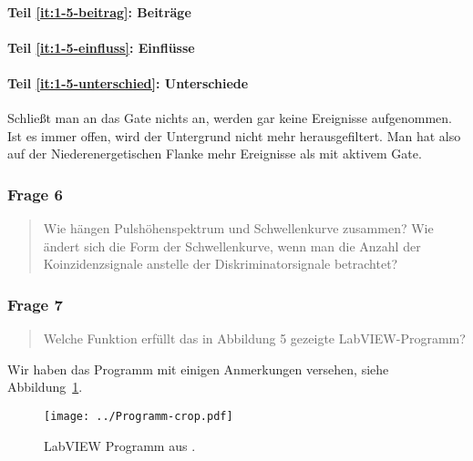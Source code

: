 \documentclass[11pt, ngerman, fleqn, DIV=15, headinclude, BCOR=2cm]{scrreprt}
\begin{document}
\paragraph{Teil \ref{it:1-5-beitrag}: Beiträge}


\paragraph{Teil \ref{it:1-5-einfluss}: Einflüsse}


\paragraph{Teil \ref{it:1-5-unterschied}: Unterschiede}

Schließt man an das Gate nichts an, werden gar keine Ereignisse aufgenommen.
Ist es immer offen, wird der Untergrund nicht mehr herausgefiltert. Man hat
also auf der Niederenergetischen Flanke mehr Ereignisse als mit aktivem Gate.

\subsubsection{Frage 6}

\begin{quote}
    Wie hängen Pulshöhenspektrum und Schwellenkurve zusammen? Wie ändert sich
    die Form der Schwellenkurve, wenn man die Anzahl der Koinzidenzsignale
    anstelle der Diskriminatorsignale betrachtet?
\end{quote}


\subsubsection{Frage 7}

\begin{quote}
    Welche Funktion erfüllt das in Abbildung 5 gezeigte LabVIEW-Programm?
\end{quote}

Wir haben das Programm mit einigen Anmerkungen versehen, siehe
Abbildung~\ref{fig:labview-test}.

\begin{figure}[htbp]
    \centering
    \texttt{[image: ../Programm-crop.pdf]}
    \caption{%
        LabVIEW Programm aus \parencite[Abbildung~5]{physik512-Anleitung}.
    }
    \label{fig:labview-test}
\end{figure}
\end{document}
